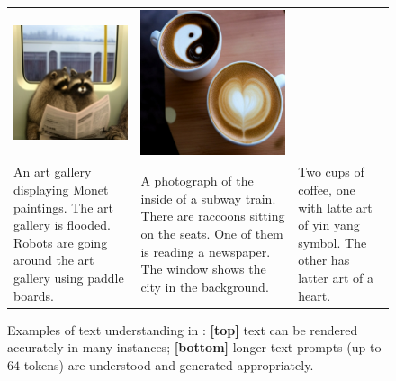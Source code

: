 \begin{figure}
\begin{tabular}{p{50mm}p{50mm}p{50mm}}
    \includegraphics[width=50mm]{figs/verticals/detail_01370_maskgit_sresg1r1} &   \includegraphics[width=50mm]{figs/verticals/detail_01459_maskgit_sresg1r1}
    \\
    \small An art gallery displaying Monet paintings. The art gallery is flooded. Robots are going around the art gallery using paddle boards. &
    \small A photograph of the inside of a subway train. There are raccoons sitting on the seats. One of them is reading a newspaper. The window shows the city in the background. &
    \small Two cups of coffee, one with latte art of yin yang symbol. The other has latter art of a heart.

  \end{tabular}
  \caption{Examples of text understanding in \name: \textbf{[top]} text can be rendered accurately in many instances; \textbf{[bottom]} longer text prompts (up to $64$ tokens) are understood and generated appropriately.}
  \label{fig:word_and_indepth_examples}
\end{figure}

